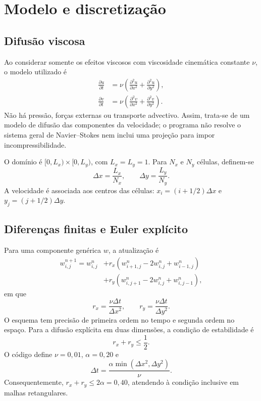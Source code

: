 \documentclass[12pt,a4paper]{article}
\begin{document}
\section{Modelo e discretização}
\subsection{Difusão viscosa}
Ao considerar somente os efeitos viscosos com viscosidade cinemática constante $\nu$, o modelo utilizado é
\begin{align}
\frac{\partial u}{\partial t}
 &= \nu\left(\frac{\partial^2u}{\partial x^2}+
                 \frac{\partial^2u}{\partial y^2}\right),\\
\frac{\partial v}{\partial t}
 &= \nu\left(\frac{\partial^2v}{\partial x^2}+
                 \frac{\partial^2v}{\partial y^2}\right).
\end{align}
Não há pressão, forças externas ou transporte advectivo. Assim, trata-se de um modelo de difusão das componentes da velocidade; o programa não resolve o sistema geral de Navier--Stokes nem inclui uma projeção para impor incompressibilidade.

O domínio é $[0,L_x)\times[0,L_y)$, com $L_x=L_y=1$. Para $N_x$ e $N_y$ células, definem-se
\[
\Delta x=\frac{L_x}{N_x},\qquad
\Delta y=\frac{L_y}{N_y}.
\]
A velocidade é associada aos centros das células:
$x_i=(i+1/2)\Delta x$ e $y_j=(j+1/2)\Delta y$.

\subsection{Diferenças finitas e Euler explícito}
Para uma componente genérica $w$, a atualização é
\begin{equation}
\begin{split}
w_{i,j}^{n+1}=w_{i,j}^{n}
 &+r_x\left(w_{i+1,j}^{n}-2w_{i,j}^{n}+w_{i-1,j}^{n}\right)\\
 &+r_y\left(w_{i,j+1}^{n}-2w_{i,j}^{n}+w_{i,j-1}^{n}\right),
\end{split}
\label{eq:atualizacao}
\end{equation}
em que
\[
r_x=\frac{\nu\Delta t}{\Delta x^2},\qquad
r_y=\frac{\nu\Delta t}{\Delta y^2}.
\]
O esquema tem precisão de primeira ordem no tempo e segunda ordem no espaço. Para a difusão explícita em duas dimensões, a condição de estabilidade é
\[
r_x+r_y\leq\frac{1}{2}.
\]
O código define $\nu=0{,}01$, $\alpha=0{,}20$ e
\begin{equation}
\Delta t=\frac{\alpha\min(\Delta x^2,\Delta y^2)}{\nu}.
\end{equation}
Consequentemente, $r_x+r_y\leq 2\alpha=0{,}40$, atendendo à condição inclusive em malhas retangulares.
\end{document}
